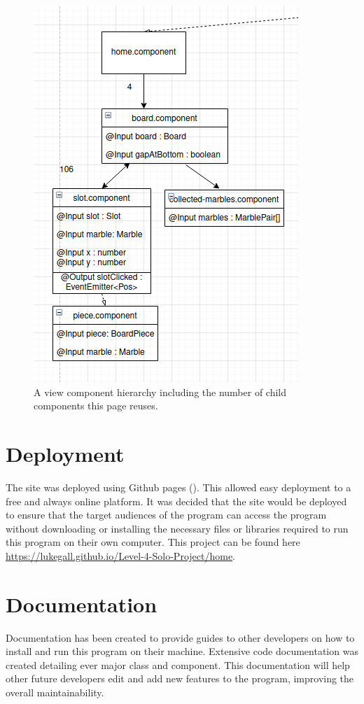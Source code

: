 \documentclass{l4proj}
\begin{document}
\begin{figure}
    \centering
    \includegraphics[width=0.45\linewidth]{images/homeComponent.png}
    \caption{A view component hierarchy including the number of child components this page reuses.}
    \label{fig:homeComponent}
\end{figure}

\section{Deployment}
The site was deployed using Github pages (\cite{github_pages}). This allowed easy deployment to a free and always online platform. It was decided that the site would be deployed to ensure that the target audiences of the program can access the program without downloading or installing the necessary files or libraries required to run this program on their own computer. This project can be found here \url{https://lukegall.github.io/Level-4-Solo-Project/home}.

\section{Documentation}
Documentation has been created to provide guides to other developers on how to install and run this program on their machine. Extensive code documentation was created detailing ever major class and component. This documentation will help other future developers edit and add new features to the program, improving the overall maintainability.
\end{document}
